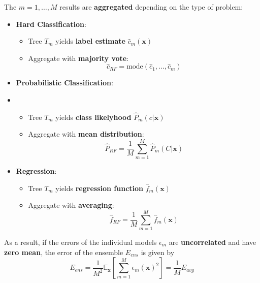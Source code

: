\newpar{}
The $m=1,\ldots, M$ results are \textbf{aggregated} depending on the type of problem:
\begin{itemize}
    \item \textbf{Hard Classification}:
          \begin{itemize}
              \item Tree $T_m$ yields \textbf{label estimate} $\widehat{c}_m(\mathbf{x})$
              \item Aggregate with \textbf{majority vote}:
                    \noindent\begin{equation*}
                        \widehat{c}_{RF} = \mathrm{mode}(\widehat{c}_1,\ldots, \widehat{c}_m)
                    \end{equation*}
          \end{itemize}
    \item \textbf{Probabilistic Classification}:
    \item \begin{itemize}
              \item Tree $T_m$ yields \textbf{class likelyhood} $\widehat{P}_m(c|\mathbf{x})$
              \item Aggregate with \textbf{mean distribution}:
                    \noindent\begin{equation*}
                        \widehat{P}_{RF} = \frac{1}{M}\sum_{m=1}^{M}\widehat{P}_m(C|\mathbf{x})
                    \end{equation*}
          \end{itemize}
    \item \textbf{Regression}:
          \begin{itemize}
              \item Tree $T_m$ yields \textbf{regression function} $\widehat{f}_m(\mathbf{x})$
              \item Aggregate with \textbf{averaging}:
                    \noindent\begin{equation*}
                        \widehat{f}_{RF} = \frac{1}{M}\sum_{m=1}^{M}\widehat{f}_m(\mathbf{x})
                    \end{equation*}
          \end{itemize}
\end{itemize}

As a result, if the errors of the individual models $\epsilon_m$ are \textbf{uncorrelated} and have \textbf{zero mean}, the error of the ensemble $E_{ens}$ is given by
\noindent\begin{equation*}
    E_{ens} = \frac{1}{M^2}\mathbb{E}_{\mathbf{x}} \left[\sum_{m=1}^{M} {\epsilon_m(\mathbf{x})}^2\right] = \frac{1}{M} E_{avg}
\end{equation*}

